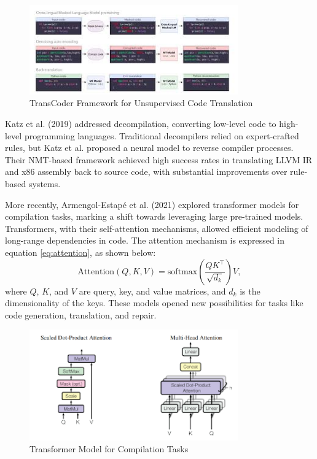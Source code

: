 \documentclass{dhbenelux}
\begin{document}
\begin{figure}[h]
    \centering
    \includegraphics[width=0.8\textwidth]{Images/4.jpg}
    \caption{TransCoder Framework for Unsupervised Code Translation}
    \label{fig:transcoder}
\end{figure}

Katz et al. (2019) addressed decompilation, converting low-level code to high-level programming languages. Traditional decompilers relied on expert-crafted rules, but Katz et al. proposed a neural model to reverse compiler processes. Their NMT-based framework achieved high success rates in translating LLVM IR and x86 assembly back to source code, with substantial improvements over rule-based systems. 

More recently, Armengol-Estapé et al. (2021) explored transformer models for compilation tasks, marking a shift towards leveraging large pre-trained models. Transformers, with their self-attention mechanisms, allowed efficient modeling of long-range dependencies in code. The attention mechanism is expressed in equation \ref{eq:attention}, as shown below:
\begin{equation}
\text{Attention}(Q, K, V) = \text{softmax}\left(\frac{QK^\top}{\sqrt{d_k}}\right)V,
\label{eq:attention}
\end{equation}
where \( Q \), \( K \), and \( V \) are query, key, and value matrices, and \( d_k \) is the dimensionality of the keys. These models opened new possibilities for tasks like code generation, translation, and repair.

\begin{figure}[h]
    \centering
    \includegraphics[width=0.8\textwidth]{Images/5.png} %
    \caption{Transformer Model for Compilation Tasks}
    \label{fig:transformer-code}
\end{figure}
\end{document}
